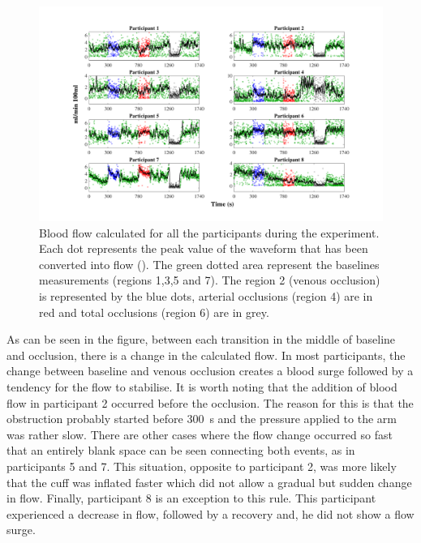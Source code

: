 \begin{figure}[!htb]
	\includegraphics[width=\textwidth,keepaspectratio,trim={3cm 0cm 3cm 0 cm},clip]{figure15}    
	\caption[Blood flow calculated from impedance plethysmography waveform at the time of the whole expetiment]{Blood flow calculated for all the participants during the experiment. Each dot represents the peak value of the waveform that has been converted into flow (\si{\bfv}). The green dotted area represent the baselines measurements (regions 1,3,5 and 7). The region 2 (venous occlusion) is represented by the blue dots, arterial occlusions (region 4) are in red and total occlusions (region 6) are in grey.}
	\label{fig:blood_flow_plethysmography}
\end{figure}

As can be seen in the figure, between each transition in the middle of baseline and occlusion, there is a change in the calculated flow. In most participants, the change between baseline and venous occlusion creates a blood surge followed by a tendency for the flow to stabilise. It is worth noting that the addition of blood flow in participant 2 occurred before the occlusion. The reason for this is that the obstruction probably started before \SI{300}{\second} and the pressure applied to the arm was rather slow. There are other cases where the flow change occurred so fast that an entirely blank space can be seen connecting both events, as in participants 5 and 7. This situation, opposite to participant 2, was more likely that the cuff was inflated faster which did not allow a gradual but sudden change in flow. Finally, participant 8 is an exception to this rule. This participant experienced a decrease in flow, followed by a recovery and, he did not show a flow surge.

